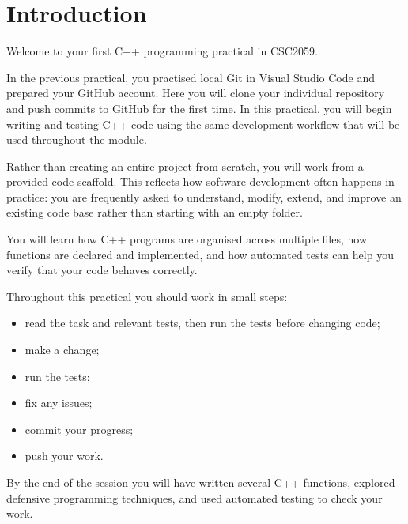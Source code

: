 \documentclass{csc2059practical}
\begin{document}
\maketitle
\tableofcontents
\clearpage

\section{Introduction}

Welcome to your first C++ programming practical in CSC2059.

In the previous practical, you practised local Git in Visual Studio Code and prepared your GitHub account. Here you will clone your individual repository and push commits to GitHub for the first time. In this practical, you will begin writing and testing C++ code using the same development workflow that will be used throughout the module.

Rather than creating an entire project from scratch, you will work from a provided code scaffold. This reflects how software development often happens in practice: you are frequently asked to understand, modify, extend, and improve an existing code base rather than starting with an empty folder.

You will learn how C++ programs are organised across multiple files, how functions are declared and implemented, and how automated tests can help you verify that your code behaves correctly.

Throughout this practical you should work in small steps:

\begin{itemize}
  \item read the task and relevant tests, then run the tests before changing code;
  \item make a change;
  \item run the tests;
  \item fix any issues;
  \item commit your progress;
  \item push your work.
\end{itemize}

By the end of the session you will have written several C++ functions, explored defensive programming techniques, and used automated testing to check your work.
\end{document}
